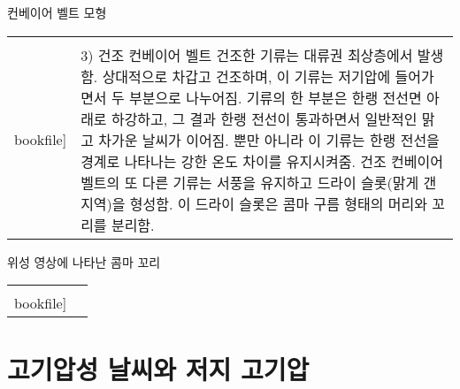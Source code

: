\begin{frame}[t]{컨베이어 벨트 모형}
	\begin{tabular}{ll}
	\begin{minipage}[t]{0.55\textwidth}\scriptsize
		\begin{figure}[t]
			\texttt{[image: \\bookfile]}
		\end{figure}
	\end{minipage}	
	&
	\begin{minipage}[t]{0.4\textwidth} \scriptsize		
		{3) 건조 컨베이어 벨트
			건조한 기류는 대류권 최상층에서 발생함. 상대적으로 차갑고 건조하며, 이 기류는 저기압에 들어가면서 두 부분으로 나누어짐. 기류의 한 부분은 한랭 전선면 아래로 하강하고, 그 결과 한랭 전선이 통과하면서 일반적인 맑고 차가운 날씨가 이어짐. 뿐만 아니라 이 기류는 한랭 전선을 경계로 나타나는 강한 온도 차이를 유지시켜줌. 건조 컨베이어 벨트의 또 다른 기류는 서풍을 유지하고 드라이 슬롯(맑게 갠 지역)을 형성함. 이 드라이 슬롯은 콤마 구름 형태의 머리와 꼬리를 분리함.}
		\end{minipage}
	\end{tabular}
\end{frame}




\begin{frame}[t]{위성 영상에 나타난 콤마 꼬리}
	\begin{tabular}{ll}
		\begin{minipage}[t]{0.55\textwidth}\scriptsize
			\begin{figure}[t]
				\texttt{[image: \\bookfile]}
			\end{figure}
		\end{minipage}	
		&
		\begin{minipage}[t]{0.4\textwidth} \scriptsize	
			
			
		\end{minipage}
	\end{tabular}
\end{frame}





\section{고기압성 날씨와 저지 고기압}



